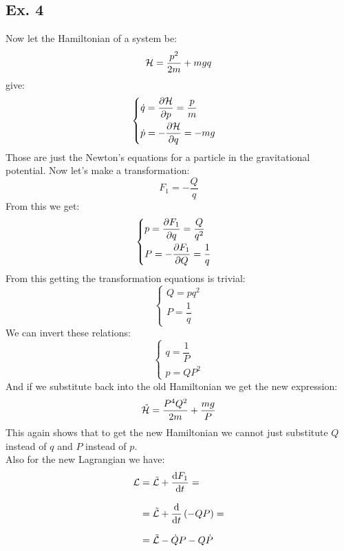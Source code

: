 \subsection{Ex. 4}
Now let the Hamiltonian of a system be:
\begin{equation}
    \mathcal{H} = \dfrac{p^2}{2m} + mgq
\end{equation}
\hamiltonref\;give:
\begin{equation}
    \begin{cases}
        \dot{q} = \pdv{\hamfun}{p} = \dfrac{p}{m}\\[8pt]
        \dot{p} = -\pdv{\hamfun}{q} = -mg
    \end{cases}
\end{equation}
Those are just the Newton's equations for a particle in the gravitational potential. Now let's make a transformation:
\begin{equation}
    F_1 = -\dfrac{Q}{q}
\end{equation}
From this we get:
\begin{equation}
    \begin{cases}
        p = \pdv{F_1}{q} = \dfrac{Q}{q^2}\\[8pt]
        P = -\pdv{F_1}{Q} = \dfrac{1}{q}
    \end{cases}
\end{equation}
From this getting the transformation equations is trivial:
\begin{equation}
    \begin{cases}
        Q = pq^2\\[8pt]
        P = \dfrac{1}{q}
    \end{cases}
\end{equation}
We can invert these relations:
\begin{equation}
    \begin{cases}
        q = \dfrac{1}{P}\\[8pt]
        p = QP^2
    \end{cases}
\end{equation}
And if we substitute back into the old Hamiltonian we get the new expression:
\begin{equation}
    \tilde{\mathcal{H}} = \dfrac{P^4 Q^2}{2m} + \dfrac{mg}{P}
\end{equation}
This again shows that to get the new Hamiltonian we cannot just substitute $Q$ instead of $q$ and $P$ instead of $p$.\\
Also for the new Lagrangian we have:
\begin{equation}
    \begin{split}
        \lagr &= \tilde{\lagr} + \dv{F_1}{t} =\\[8pt]
        &= \tilde{\lagr} + \dv{}{t}\brackets{-QP} =\\[8pt]
        &=\tilde{\lagr} - \dot{Q}P - Q\dot{P}
    \end{split}
\end{equation}
